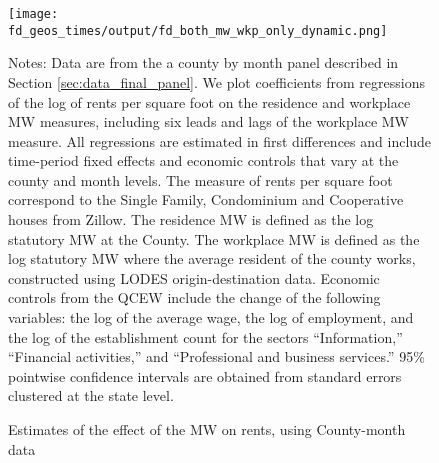 
\begin{figure}[h!]
    \centering
    \caption{Estimates of the effect of the MW on rents, using County-month data}
    \label{fig:dynamic_county_month}

	\texttt{[image: fd\_geos\_times/output/fd\_both\_mw\_wkp\_only\_dynamic.png]}

    \begin{minipage}{.95\textwidth} \footnotesize
        \vspace{3mm}
        Notes:
        Data are from the a county by month panel described in Section 
        \ref{sec:data_final_panel}.
        We plot coefficients from regressions of the log of rents per
        square foot on the residence and workplace MW measures, including 
        six leads and lags of the workplace MW measure.
        All regressions are estimated in first differences and include 
        time-period fixed effects and economic controls that vary at the 
        county and month levels.
        The measure of rents per square foot correspond to the Single Family, 
        Condominium and Cooperative houses from Zillow.
        The residence MW is defined as the log statutory MW at the County.
        The workplace MW is defined as the log statutory MW where the average 
        resident of the county works, constructed using LODES 
        origin-destination data.
        Economic controls from the QCEW include the change of the following 
        variables: the log of the average wage, the log of employment, and the 
        log of the establishment count for the sectors ``Information,'' 
        ``Financial activities,'' and ``Professional and business services.''
        95\% pointwise confidence intervals are obtained from standard errors 
        clustered at the state level.
    \end{minipage}
\end{figure}
